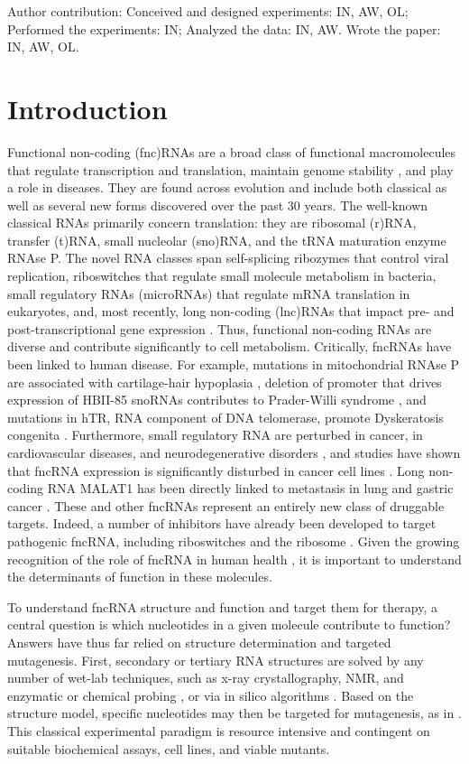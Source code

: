 \documentclass[12pt,a4paper]{report}
\begin{document}
Author contribution: Conceived and designed experiments: IN, AW, OL; Performed the experiments: IN; Analyzed the data: IN, AW. Wrote the paper: IN, AW, OL.
\clearpage
\section{Introduction}
Functional non-coding (fnc)RNAs are a broad class of functional macromolecules that regulate transcription and translation, maintain genome stability \cite{Mattick2006}, and play a role in diseases. They are found across evolution and include both classical as well as several new forms discovered over the past 30 years. The well-known classical RNAs primarily concern translation: they are ribosomal (r)RNA, transfer (t)RNA, small nucleolar (sno)RNA, and the tRNA maturation enzyme RNAse P. The novel RNA classes span self-splicing ribozymes that control viral replication, riboswitches that regulate small molecule metabolism in bacteria, small regulatory RNAs (microRNAs) that regulate mRNA translation in eukaryotes, and, most recently, long non-coding (lnc)RNAs that impact pre- and post-transcriptional gene expression  \cite{Mercer2009}. Thus, functional non-coding RNAs are diverse and contribute significantly to cell metabolism. Critically, fncRNAs have been linked to human disease. For example, mutations in mitochondrial RNAse P are associated with cartilage-hair hypoplasia \cite{Ridanpaa2001}, deletion of promoter that drives expression of HBII-85 snoRNAs contributes to Prader-Willi syndrome \cite{Sahoo2008}, and mutations in hTR, RNA component of DNA telomerase, promote Dyskeratosis congenita \cite{Vulliamy2001}. Furthermore, small regulatory RNA are perturbed in cancer, in cardiovascular diseases, and neurodegenerative disorders \cite{Esteller2011}, and studies have shown that fncRNA expression is significantly disturbed in cancer cell lines \cite{Taft2010}. Long non-coding RNA MALAT1 has been directly linked to metastasis in lung and gastric cancer \cite{Gutschner2013}. These and other fncRNAs represent an entirely new class of druggable targets. Indeed, a number of inhibitors have already been developed to target pathogenic fncRNA, including riboswitches \cite{Qi2016, Howe2015} and the ribosome \cite{Wilson2014}. Given the growing recognition of the role of fncRNA in human health \cite{Naderi-Meshkin2015}, it is important to understand the determinants of function in these molecules.

To understand fncRNA structure and function and target them for therapy, a central question is which nucleotides in a given molecule contribute to function? Answers have thus far relied on structure determination and targeted mutagenesis. First, secondary or tertiary RNA structures are solved by any number of wet-lab techniques, such as x-ray crystallography, NMR, and enzymatic or chemical probing \cite{Weeks2010}, or via in silico algorithms \cite{Markham2008, Parisien2008, Reeder2006, Zuker2003, Miao2017}. Based on the structure model, specific nucleotides may then be targeted for mutagenesis, as in \cite{Nelson2008}. This classical experimental paradigm is resource intensive and contingent on suitable biochemical assays, cell lines, and viable mutants. 
\end{document}
